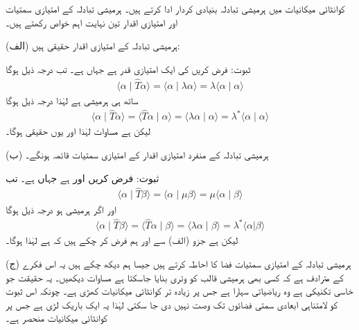 کوانٹائی میکانیات میں ہرمیشی تبادلہ  بنیادی کردار ادا کرتے ہیں۔ ہرمیشی تبادلہ کے امتیازی سمتیات اور امتیازی اقدار تین نہایت اہم خواص رکھتے ہیں۔

(الف) ہرمیشی تبادلہ کے امتیازی اقدار حقیقی ہیں:

ثبوت: فرض کریں  کی ایک امتیازی قدر  ہے  جہاں  ہے۔ تب درجہ ذیل ہوگا
\begin{align*}
	\langle\alpha\mid\hat{T}\alpha\rangle = \langle\alpha\mid\lambda\alpha\rangle = \lambda\langle\alpha\mid\alpha\rangle
\end{align*}
ساتھ ہی  ہرمیشی ہے لہٰذا درجہ ذیل ہوگا
\begin{align*}
	\langle\alpha\mid\hat{T}\alpha\rangle = \langle\hat{T}\alpha\mid\alpha\rangle = \langle\lambda\alpha\mid\alpha\rangle = \lambda^*\langle\alpha\mid\alpha\rangle
\end{align*}
لیکن  ہے مساوات  لہٰذا  اور یوں  حقیقی ہوگا۔

(ب) ہرمیشی تبادلہ کے منفرد امتیازی اقدار کے امتیازی سمتیات قائمہ ہونگے۔

ثبوت: فرض کریں  اور  ہے جہاں  ہے۔ تب
\begin{align*}
	\langle\alpha\mid\hat{T}\beta\rangle = \langle\alpha\mid\mu\beta\rangle = \mu\langle\alpha\mid\beta\rangle
\end{align*}
اور اگر  ہرمیشی ہو درجہ ذیل ہوگا
\begin{align*}
	\langle\alpha\mid\hat{T}\beta\rangle = \langle\hat{T}\alpha\mid\beta\rangle = \langle\lambda\alpha\mid\beta\rangle = \lambda^*\langle\alpha|\beta\rangle
\end{align*}
لیکن  ہے جزو (الف) سے اور ہم فرض کر چکے ہیں کہ  ہے لہٰذا  ہوگا۔

(ج) ہرمیشی تبادلہ کے امتیازی سمتیات فضا کا احاطہ کرتے ہیں جیسا ہم دیکھ چکے ہیں یہ اس فکرے کے مترادف ہے کہ کسی بھی ہرمیشی قالب کو وتری بنایا جاسکتا ہے مساوات  دیکھیں۔ یہ حقیقت جو خاسی تکنیکی ہے وہ ریاضیاتی سہارا ہے جس پر زیادہ تر کوانٹائی میکانیات کھڑی ہے۔ چونکہ اس ثبوت کو لامتناہی ابعادی سمتی فضائوں تک وصت نہیں دی جا سکتی لہٰذا یہ ایک باریک لڑی ہے جس پر کوانٹائی میکانیات منحصر ہے۔

